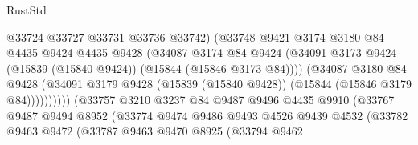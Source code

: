 \begin{lexlean}{RustStd}
\begin{coremodule}
                                      @33724
                                      @33727
                                      @33731
                                      @33736
                                      @33742)
                                    (@33748
                                      @9421
                                      @3174
                                      @3180
                                      @84
                                      @4435
                                      @9424
                                      @4435
                                      @9428
                                      (@34087
                                        @3174
                                        @84
                                        @9424
                                        (@34091
                                          @3173
                                          @9424
                                          (@15839 (@15840 @9424))
                                          (@15844 (@15846 @3173 @84))))
                                      (@34087
                                        @3180
                                        @84
                                        @9428
                                        (@34091
                                          @3179
                                          @9428
                                          (@15839 (@15840 @9428))
                                          (@15844 (@15846 @3179 @84))))))))))
                          (@33757
                            @3210
                            @3237
                            @84
                            @9487
                            @9496
                            @4435
                            @9910
                            (@33767
                              @9487
                              @9494
                              @8952
                              (@33774
                                @9474
                                @9486
                                @9493
                                @4526
                                @9439
                                @4532
                                (@33782
                                  @9463
                                  @9472
                                  (@33787
                                    @9463
                                    @9470
                                    @8925
                                    (@33794
                                      @9462

\end{coremodule}
\end{lexlean}
